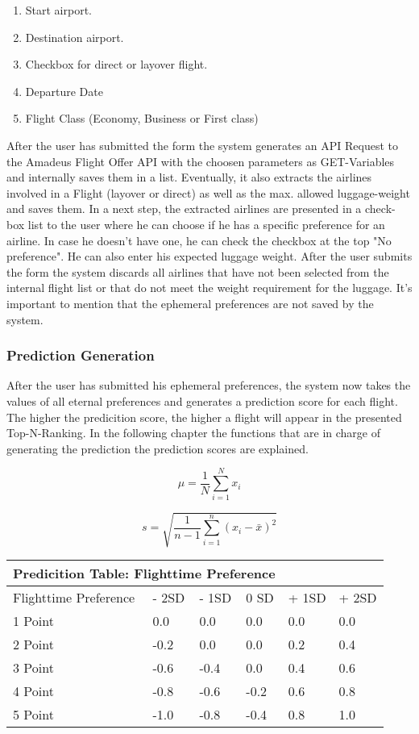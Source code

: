 \documentclass[a4paper]{article}
\begin{document}
\begin{enumerate}
    \item Start airport.
    \item Destination airport.
    \item Checkbox for direct or layover flight.
    \item Departure Date
    \item Flight Class (Economy, Business or First class)
\end{enumerate}

After the user has submitted the form the system generates an API Request to the Amadeus Flight Offer API with the choosen parameters as GET-Variables and internally saves them in a list. Eventually, it also extracts the airlines involved in a Flight (layover or direct) as well as the max. allowed luggage-weight and saves them. In a next step, the extracted airlines are presented in a check-box list to the user where he can choose if he has a specific preference for an airline. In case he doesn't have one, he can check the checkbox at the top "No preference". He can also enter his expected luggage weight. After the user submits the form the system discards all airlines that have not been selected from the internal flight list or that do not meet the weight requirement for the luggage. It's important to mention that the ephemeral preferences are not saved by the system.

\subsubsection{Prediction Generation}

After the user has submitted his ephemeral preferences, the system now takes the values of all eternal preferences and generates a prediction score for each flight. The higher the predicition score, the higher a flight will appear in the presented Top-N-Ranking. In the following chapter the functions that are in charge of generating the prediction the prediction scores are explained.

\[
\mu = \frac{1}{N} \sum_{i=1}^{N} x_i
\]

\[
s = \sqrt{\frac{1}{n - 1} \sum_{i=1}^{n} (x_i - \bar{x})^2}
\]

\vspace{0.5cm}

\begin{tabular}{ |p{3.5cm}||p{1.5cm}|p{1.5cm}|p{1.5cm}|p{1.5cm}|p{1.5cm}|  }
 \hline
 \multicolumn{4}{|c|}{Predicition Table: Flighttime Preference} \\
 \hline
 Flighttime Preference & - 2SD & - 1SD & 0 SD & + 1SD & + 2SD\\
 \hline
 1 Point   & 0.0    & 0.0 & 0.0 & 0.0 & 0.0 \\
 2 Point &   -0.2  & 0.0   & 0.0 & 0.2 & 0.4 \\
 3 Point & -0.6 & -0.4 &  0.0 & 0.4 & 0.6\\
 4 Point & -0.8   & -0.6 & -0.2 &  0.6 & 0.8\\
 5 Point & -1.0  & -0.8 & -0.4 & 0.8 & 1.0\\

 \hline
\end{tabular}
\end{document}
